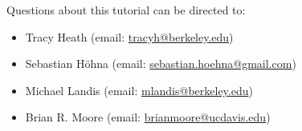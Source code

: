 \newpage
\vspace{5cm}
Questions about this tutorial can be directed to: \\\vspace{-10mm}
\begin{itemize}
\item Tracy Heath (email: \href{mailto:tracyh@berkeley.edu}{tracyh@berkeley.edu}) \\\vspace{-8mm}
\item Sebastian H\"{o}hna (email: \href{mailto:sebastian.hoehna@gmail.com}{sebastian.hoehna@gmail.com}) \\\vspace{-8mm}
\item Michael Landis (email: \href{mailto:mlandis@berkeley.edu}{mlandis@berkeley.edu}) \\\vspace{-8mm} 
\item Brian R. Moore (email: \href{mailto:brianmoore@ucdavis.edu}{brianmoore@ucdavis.edu}) \\\vspace{-8mm}
\end{itemize}






